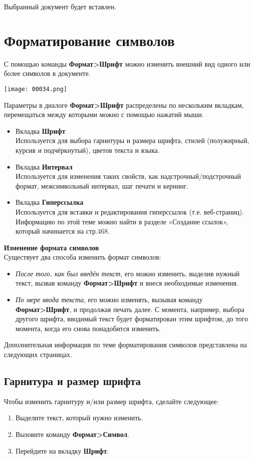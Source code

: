 \documentclass[a4paper,10pt]{article}
\begin{document}
Выбранный документ будет вставлен.

\section{Форматирование символов}
С помощью команды \textbf{Формат>Шрифт} можно изменить внешний вид одного или более символов в документе.

\texttt{[image: 00034.png]}

Параметры в диалоге \textbf{Формат>Шрифт} распределены по нескольким вкладкам, перемещаться между которыми можно с помощью нажатий мыши.
\begin{itemize}
 \item Вкладка \textbf{Шрифт}\\
Используется для выбора гарнитуры и размера шрифта, стилей (полужирный, курсив и подчёркнутый), цветов текста и языка.
\item Вкладка \textbf{Интервал}\\
Используется для изменения таких свойств, как надстрочный/подстрочный формат, межсимвольный интервал, шаг печати и кернинг.
\item Вкладка \textbf{Гиперссылка}\\
Используется для вставки и редактирования гиперссылок (т.е. веб-страниц). Информацию по этой теме можно найти в разделе «Создание ссылок», который начинается на стр.468.
\end{itemize}

\textbf{Изменение формата символов}\\
Существует два способа изменить формат символов:
\begin{itemize}
 \item \textit{После того, как был введён текст}, его можно изменить, выделив нужный текст, вызвав команду \textbf{Формат>Шрифт} и внеся необходимые изменения.
 \item \textit{По мере ввода текста}, его можно изменять, вызывая команду \textbf{Формат>Шрифт}, и продолжая печать далее. С момента, например, выбора другого шрифта, вводимый текст будет форматирован этим шрифтом, до того момента, когда его снова понадобится изменить.
\end{itemize}

Дополнительная информация по теме форматирования символов представлена на следующих страницах.

\subsection{Гарнитура и размер шрифта}
Чтобы изменить гарнитуру и/или размер шрифта, сделайте следующее:
\begin{enumerate}
 \item Выделите текст, который нужно изменить.
\item Вызовите команду \textbf{Формат>Символ}.
\item Перейдите на вкладку \textbf{Шрифт}.
\end{enumerate}
\end{document}
